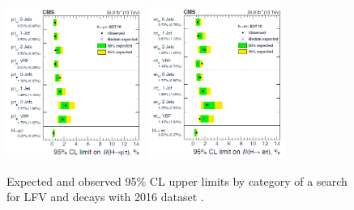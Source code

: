 \begin{figure}[htbp]
  \centering
  \includegraphics[width=0.4\textwidth]{plots/chapter2/BHmt.png}
  \includegraphics[width=0.4\textwidth]{plots/chapter2/BHet.png}
  \caption{Expected and observed 95\% CL upper limits by category of a search for LFV \Hmt and \Het decays with 2016 dataset \cite{Sirunyan:2019shc}.}
  \label{fig:bh}
\end{figure}
